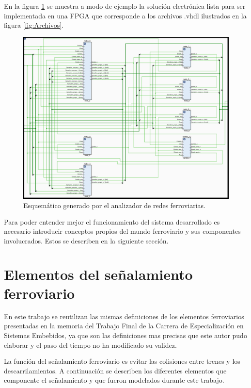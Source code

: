		En la figura \ref{fig:Esquematico} se muestra a modo de ejemplo la solución electrónica lista para ser implementada en una FPGA que corresponde a los archivos .vhdl ilustrados en la figura \ref{fig:Archivos}.
		
		\begin{figure}[htbp!]
			\centering
			\includegraphics[scale=.45]{./Figures/Esquematico}
			\caption{Esquemático generado por el analizador de redes ferroviarias.}
			\label{fig:Esquematico}
		\end{figure}
		
		Para poder entender mejor el funcionamiento del sistema desarrollado es necesario introducir conceptos propios del mundo ferroviario y sus componentes involucrados. Estos se describen en la siguiente sección.

	\section{Elementos del señalamiento ferroviario}
	
		En este trabajo se reutilizan las mismas definiciones de los elementos ferroviarios presentadas en la memoria del Trabajo Final de la Carrera de Especialización en Sistemas Embebidos, ya que son las definiciones mas precisas que este autor pudo elaborar y el paso del tiempo no ha modificado su validez.
		
		La función del señalamiento ferroviario es evitar las colisiones entre trenes y los descarrilamientos. A continuación se describen los diferentes elementos que componente el señalamiento y que fueron modelados durante este trabajo.
		
